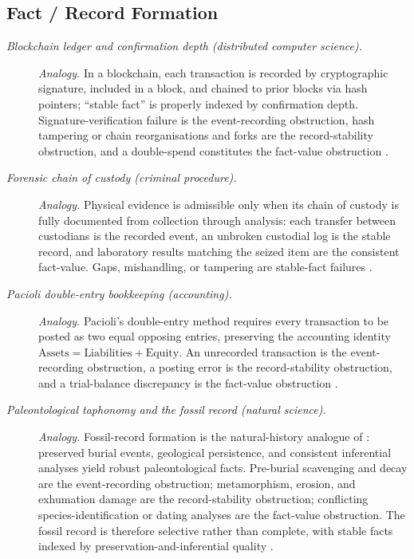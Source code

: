 \subsection*{ Fact / Record Formation}
\begingroup\small
\begin{description}
\item[\emph{Blockchain ledger and confirmation depth (distributed
computer science).}] \textit{Analogy.}
In a blockchain, each transaction is recorded by cryptographic
signature, included in a block, and chained to prior blocks via
hash pointers; ``stable fact'' is properly indexed by
confirmation depth.  Signature-verification failure is the
event-recording obstruction, hash tampering or chain
reorganisations and forks are the record-stability obstruction,
and a double-spend constitutes the fact-value obstruction
\citep{Nakamoto2008Bitcoin}.

\item[\emph{Forensic chain of custody (criminal procedure).}] \textit{Analogy.}
Physical evidence is admissible only when its chain of custody
is fully documented from collection through analysis: each
transfer between custodians is the recorded event, an unbroken
custodial log is the stable record, and laboratory results
matching the seized item are the consistent fact-value.  Gaps,
mishandling, or tampering are  stable-fact failures
\citep{Rice2008ElectronicEvidence}.

\item[\emph{Pacioli double-entry bookkeeping (accounting).}] \textit{Analogy.}
Pacioli's double-entry method requires every transaction to be
posted as two equal opposing entries, preserving the accounting
identity \(\text{Assets}=\text{Liabilities}+\text{Equity}\).  An
unrecorded transaction is the event-recording obstruction, a
posting error is the record-stability obstruction, and a
trial-balance discrepancy is the fact-value obstruction
\citep{Pacioli1494Summa}.

\item[\emph{Paleontological taphonomy and the fossil record
(natural science).}] \textit{Analogy.}
Fossil-record formation is the natural-history analogue of :
preserved burial events, geological persistence, and consistent
inferential analyses yield robust paleontological facts.  Pre-burial
scavenging and decay are the event-recording obstruction;
metamorphism, erosion, and exhumation damage are the
record-stability obstruction; conflicting species-identification
or dating analyses are the fact-value obstruction.  The fossil
record is therefore selective rather than complete, with stable
facts indexed by preservation-and-inferential quality
\citep{KidwellHolland2002QualityFossilRecord}.
\end{description}
\endgroup

